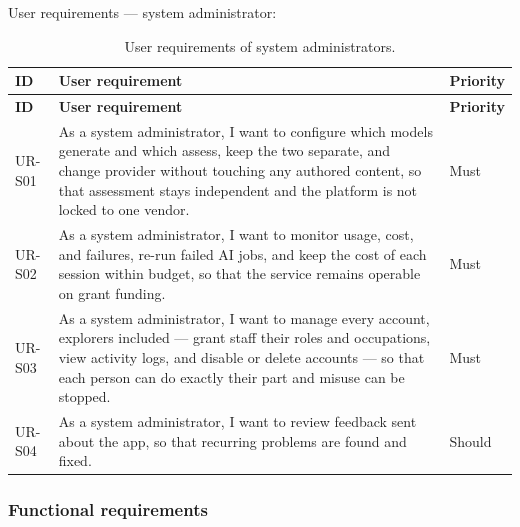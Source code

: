 User requirements --- system administrator:

{\small
\begin{longtable}{|>{\raggedright\arraybackslash}p{}|>{\raggedright\arraybackslash}p{}|>{\raggedright\arraybackslash}p{}|}
\caption{User requirements of system administrators.} \\
\hline
\textbf{ID} & \textbf{User requirement} & \textbf{Priority} \\ \hline
\endfirsthead
\hline
\textbf{ID} & \textbf{User requirement} & \textbf{Priority} \\ \hline
\endhead
UR-S01 & As a system administrator, I want to configure which models generate and which assess, keep the two separate, and change provider without touching any authored content, so that assessment stays independent and the platform is not locked to one vendor. & Must \\ \hline
UR-S02 & As a system administrator, I want to monitor usage, cost, and failures, re-run failed AI jobs, and keep the cost of each session within budget, so that the service remains operable on grant funding. & Must \\ \hline
UR-S03 & As a system administrator, I want to manage every account, explorers included --- grant staff their roles and occupations, view activity logs, and disable or delete accounts --- so that each person can do exactly their part and misuse can be stopped. & Must \\ \hline
UR-S04 & As a system administrator, I want to review feedback sent about the app, so that recurring problems are found and fixed. & Should \\ \hline
\end{longtable}
}

\subsubsection{Functional requirements}

